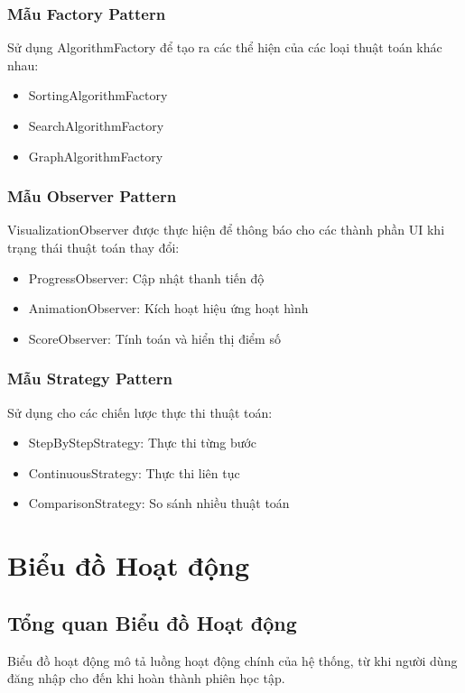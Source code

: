 \subsubsection{Mẫu Factory Pattern}
Sử dụng AlgorithmFactory để tạo ra các thể hiện của các loại thuật toán khác nhau:
\begin{itemize}
    \item SortingAlgorithmFactory
    \item SearchAlgorithmFactory  
    \item GraphAlgorithmFactory
\end{itemize}

\subsubsection{Mẫu Observer Pattern}
VisualizationObserver được thực hiện để thông báo cho các thành phần UI khi trạng thái thuật toán thay đổi:
\begin{itemize}
    \item ProgressObserver: Cập nhật thanh tiến độ
    \item AnimationObserver: Kích hoạt hiệu ứng hoạt hình
    \item ScoreObserver: Tính toán và hiển thị điểm số
\end{itemize}

\subsubsection{Mẫu Strategy Pattern}
Sử dụng cho các chiến lược thực thi thuật toán:
\begin{itemize}
    \item StepByStepStrategy: Thực thi từng bước
    \item ContinuousStrategy: Thực thi liên tục
    \item ComparisonStrategy: So sánh nhiều thuật toán
\end{itemize}

\section{Biểu đồ Hoạt động}
\label{sec:activity-diagram}

\subsection{Tổng quan Biểu đồ Hoạt động}
\label{subsec:activity-overview}

Biểu đồ hoạt động mô tả luồng hoạt động chính của hệ thống, từ khi người dùng đăng nhập cho đến khi hoàn thành phiên học tập.

